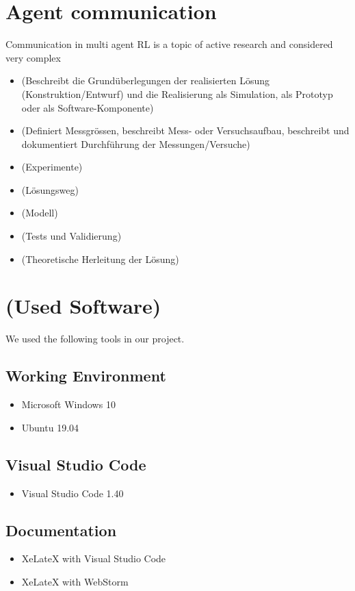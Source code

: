 \section{Agent communication}\label{reduced_action_space}

Communication in multi agent RL is a topic of active research and considered very complex



\begin{itemize}
\item (Beschreibt die Grundüberlegungen der realisierten Lösung (Konstruktion/Entwurf) und die Realisierung als Simulation, als Prototyp oder als Software-Komponente)
\item (Definiert Messgrössen, beschreibt Mess- oder Versuchsaufbau, beschreibt und dokumentiert Durchführung der Messungen/Versuche)
\item (Experimente)
\item (Lösungsweg)
\item (Modell)
\item (Tests und Validierung)
\item (Theoretische Herleitung der Lösung)
\end{itemize}

\section{(Used Software)}\label{software}
We used the following tools in our project.

\subsection*{Working Environment}\label{os}
\begin{itemize}
	\item Microsoft Windows 10
	\item Ubuntu 19.04
\end{itemize}

\subsection*{Visual Studio Code}\label{vsc}
\begin{itemize}
	\item Visual Studio Code 1.40
\end{itemize}

\subsection*{Documentation}\label{dokutools}
\begin{itemize}
	\item XeLateX with Visual Studio Code
	\item XeLateX with WebStorm
\end{itemize}


